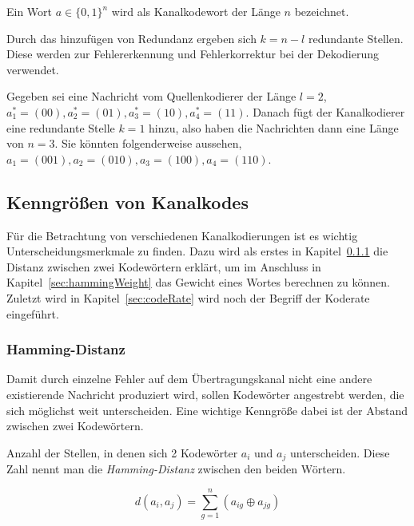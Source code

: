 \begin{t_def}
Ein Wort $a \in \{0,1\}^n$ wird als Kanalkodewort der Länge $n$ bezeichnet.
\end{t_def} 

Durch das hinzufügen von Redundanz ergeben sich $k = n - l$ redundante Stellen. Diese werden zur Fehlererkennung und Fehlerkorrektur bei der Dekodierung verwendet.

\begin{e_exa}
Gegeben sei eine Nachricht vom Quellenkodierer der Länge $l=2$, $a^*_{1}=(00),a^*_{2}=(01),a^*_{3}=(10),a^*_{4}=(11)$. Danach fügt der Kanalkodierer eine redundante Stelle $k=1$ hinzu, also haben die Nachrichten dann eine Länge von $n=3$. Sie könnten folgenderweise aussehen, $a_{1}=(001),a_{2}=(010),a_{3}=(100),a_{4}=(110)$.
\end{e_exa}

\subsection{Kenngrößen von Kanalkodes}
\label{sec:channelParameters}
Für die Betrachtung von verschiedenen Kanalkodierungen ist es wichtig Unterscheidungsmerkmale zu finden. Dazu wird als erstes in Kapitel~\ref{sec:hammingDistance} die Distanz zwischen zwei Kodewörtern erklärt, um im Anschluss in Kapitel~\ref{sec:hammingWeight} das Gewicht eines Wortes berechnen zu können. Zuletzt wird in Kapitel~\ref{sec:codeRate} wird noch der Begriff der Koderate eingeführt.

\subsubsection{Hamming-Distanz}
\label{sec:hammingDistance}
Damit durch einzelne Fehler auf dem Übertragungskanal nicht eine andere existierende Nachricht produziert wird, sollen Kodewörter angestrebt werden, die sich möglichst weit unterscheiden. Eine wichtige Kenngröße dabei ist der Abstand zwischen zwei Kodewörtern.

\begin{t_def}
Anzahl der Stellen, in denen sich 2 Kodewörter $a_i$ und $a_j$ unterscheiden. Diese Zahl nennt man die \emph{Hamming-Distanz} zwischen den beiden Wörtern.
\end{t_def} 
 
\begin{equation}
d(a_i,a_j) = \sum^{n}_{g=1} (a_{ig} \oplus a_{jg})
\label{eq:hammingDistance}
\end{equation}

